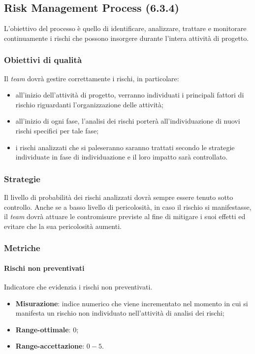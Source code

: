 \subsection{Risk Management Process (6.3.4)}
L'obiettivo del processo è quello di identificare, analizzare, trattare e monitorare continuamente i rischi che possono insorgere durante l'intera attività di progetto.
\subsubsection{Obiettivi di qualità}
Il \textit{team} dovrà gestire correttamente i rischi, in particolare:
\begin{itemize}
\item all'inizio dell'attività di progetto, verranno individuati i principali fattori di rischio riguardanti l'organizzazione delle attività;
\item all'inizio di ogni fase, l'analisi dei rischi porterà all'individuazione di nuovi rischi specifici per tale fase;
\item i rischi analizzati che si paleseranno saranno trattati secondo le strategie individuate in fase di individuazione e il loro impatto sarà controllato.
\end{itemize}
\subsubsection{Strategie}
Il livello di probabilità dei rischi analizzati dovrà sempre essere tenuto sotto controllo. Anche se a basso livello di pericolosità, in caso il rischio si manifestasse, il \textit{team} dovrà attuare le contromisure previste al fine di mitigare i suoi effetti ed evitare che la sua pericolosità aumenti.
\subsubsection{Metriche}
\paragraph{Rischi non preventivati}
Indicatore che evidenzia i rischi non preventivati.
\begin{itemize}
\item \textbf{Misurazione}: indice numerico che viene incrementato nel momento in cui si manifesta un rischio non individuato nell'attività di analisi dei rischi;
\item \textbf{Range-ottimale}: $0$;
\item \textbf{Range-accettazione}: $0 - 5$.
\end{itemize}
